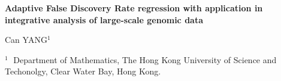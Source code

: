 \documentclass[12pt]{article}
\begin{document}
\begin{flushleft}


{\LARGE\bf Adaptive False Discovery Rate regression with
application in integrative analysis of large-scale
genomic data}


\vspace{1.0cm}

Can YANG$^1$

\begin{description}

\item $^1 \;$ Department of Mathematics, The Hong Kong University of Science and Techonolgy,
Clear Water Bay, Hong Kong.

\end{description}

\end{flushleft}


\vspace{0.75cm}
\end{document}
